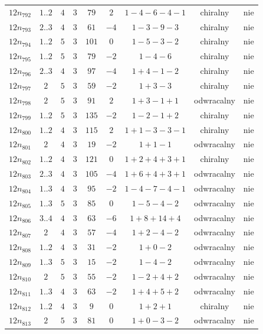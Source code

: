 \begin{longtable}{ccccccccc}
$12n_{792}$ & $1..2$ & $4$ & $3$ & $79$ & $2$ & $1-4-6-4-1$ & chiralny & nie \\
$12n_{793}$ & $2..3$ & $4$ & $3$ & $61$ & $-4$ & $1-3-9-3$ & chiralny & nie \\
$12n_{794}$ & $1..2$ & $5$ & $3$ & $101$ & $0$ & $1-5-3-2$ & chiralny & nie \\
$12n_{795}$ & $1..2$ & $5$ & $3$ & $79$ & $-2$ & $1-4-6$ & chiralny & nie \\
$12n_{796}$ & $2..3$ & $4$ & $3$ & $97$ & $-4$ & $1+4-1-2$ & chiralny & nie \\
$12n_{797}$ & $2$ & $5$ & $3$ & $59$ & $-2$ & $1+3-3$ & chiralny & nie \\
$12n_{798}$ & $2$ & $5$ & $3$ & $91$ & $2$ & $1+3-1+1$ & odwracalny & nie \\
$12n_{799}$ & $1..2$ & $5$ & $3$ & $135$ & $-2$ & $1-2-1+2$ & chiralny & nie \\
$12n_{800}$ & $1..2$ & $4$ & $3$ & $115$ & $2$ & $1+1-3-3-1$ & chiralny & nie \\
$12n_{801}$ & $2$ & $4$ & $3$ & $19$ & $-2$ & $1+1-1$ & odwracalny & nie \\
$12n_{802}$ & $1..2$ & $4$ & $3$ & $121$ & $0$ & $1+2+4+3+1$ & chiralny & nie \\
$12n_{803}$ & $2..3$ & $4$ & $3$ & $105$ & $-4$ & $1+6+4+3+1$ & odwracalny & nie \\
$12n_{804}$ & $1..3$ & $4$ & $3$ & $95$ & $-2$ & $1-4-7-4-1$ & odwracalny & nie \\
$12n_{805}$ & $1..3$ & $5$ & $3$ & $85$ & $0$ & $1-5-4-2$ & odwracalny & nie \\
$12n_{806}$ & $3..4$ & $4$ & $3$ & $63$ & $-6$ & $1+8+14+4$ & odwracalny & nie \\
$12n_{807}$ & $2$ & $4$ & $3$ & $57$ & $-4$ & $1+2-4-2$ & odwracalny & nie \\
$12n_{808}$ & $1..2$ & $4$ & $3$ & $31$ & $-2$ & $1+0-2$ & odwracalny & nie \\
$12n_{809}$ & $1..3$ & $5$ & $3$ & $15$ & $-2$ & $1-4-2$ & odwracalny & nie \\
$12n_{810}$ & $2$ & $5$ & $3$ & $55$ & $-2$ & $1-2+4+2$ & odwracalny & nie \\
$12n_{811}$ & $1..3$ & $4$ & $3$ & $63$ & $-2$ & $1+4+5+2$ & odwracalny & nie \\
$12n_{812}$ & $1..2$ & $4$ & $3$ & $9$ & $0$ & $1+2+1$ & chiralny & nie \\
$12n_{813}$ & $2$ & $5$ & $3$ & $81$ & $0$ & $1+0-3-2$ & odwracalny & nie \\

\end{longtable}
